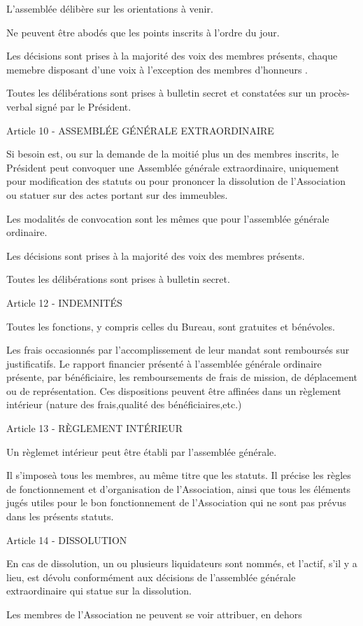 \documentclass[a4paper]{article}
\begin{document}
L'assemblée délibère sur les orientations à venir.

Ne peuvent être abodés que les points inscrits à l'ordre du jour.

Les décisions sont prises à la majorité des voix des membres présents, chaque memebre disposant d'une voix à l'exception des membres d'honneurs .

Toutes les délibérations sont prises à bulletin secret et constatées sur un procès-verbal signé par le Président.

Article 10 - ASSEMBLÉE GÉNÉRALE EXTRAORDINAIRE

Si besoin est, ou sur la demande de la moitié plus un des membres inscrits, le Président peut convoquer une Assemblée générale extraordinaire, uniquement pour modification des statuts ou pour prononcer la dissolution de l'Association ou statuer sur des actes portant sur des immeubles.

Les modalités de convocation sont les mêmes que pour l'assemblée générale ordinaire.

Les décisions sont prises à la majorité des voix des membres présents.

Toutes les délibérations sont prises à bulletin secret.

Article 12 - INDEMNITÉS

Toutes les fonctions, y compris celles du Bureau, sont gratuites et bénévoles.

Les frais occasionnés par l'accomplissement de leur mandat sont remboursés sur justificatifs. Le rapport financier présenté à l'assemblée générale ordinaire présente, par bénéficiaire, les remboursements de frais de mission, de déplacement ou de représentation. Ces dispositions peuvent être affinées dans un règlement intérieur (nature des frais,qualité des bénéficiaires,etc.)

Article 13 - RÈGLEMENT INTÉRIEUR

Un règlemet intérieur peut être établi par l'assemblée générale.

Il s'imposeà tous les membres, au même titre que les statuts. Il précise les règles de fonctionnement et d'organisation de l'Association, ainsi que tous les éléments jugés utiles pour le bon fonctionnement de l'Association qui ne sont pas prévus dans les présents statuts.

Article 14 - DISSOLUTION

En cas de dissolution, un ou plusieurs liquidateurs sont nommés, et l'actif, s'il y a lieu, est dévolu conformément aux décisions de l'assemblée générale extraordinaire qui statue sur la dissolution.

Les membres de l'Association ne peuvent se voir attribuer, en dehors
\end{document}
